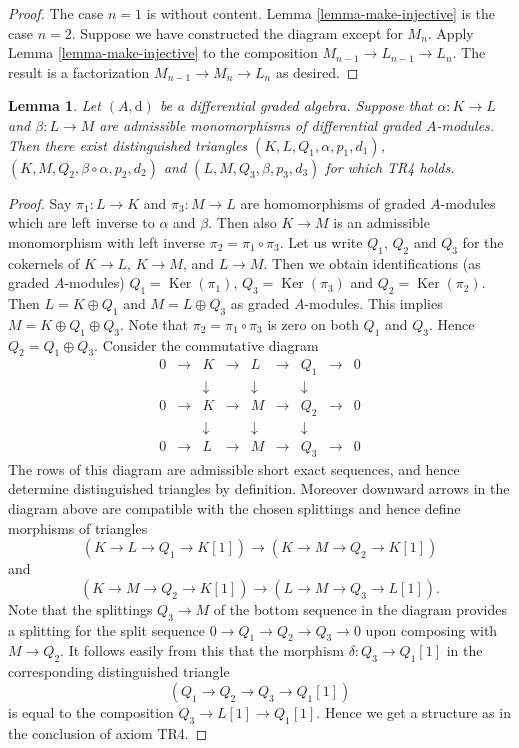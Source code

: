 \documentclass{stacks-project}
\theoremstyle{plain}
\newtheorem{lemma}[subsection]{Lemma}
\theoremstyle{definition}
\theoremstyle{remark}
\numberwithin{equation}{subsection}
\def\Ker{\mathop{\mathrm{Ker}}}
\begin{document}
\begin{proof}
The case $n = 1$ is without content.
Lemma \ref{lemma-make-injective} is the case $n = 2$.
Suppose we have constructed the diagram
except for $M_n$. Apply Lemma \ref{lemma-make-injective} to
the composition $M_{n - 1} \to L_{n - 1} \to L_n$.
The result is a factorization $M_{n - 1} \to M_n \to L_n$
as desired.
\end{proof}

\begin{lemma}
\label{lemma-two-split-injections}
Let $(A, \text{d})$ be a differential graded algebra. Suppose that
$\alpha : K \to L$ and $\beta : L \to M$ are admissible monomorphisms
of differential graded $A$-modules. Then there exist distinguished triangles
$(K, L, Q_1, \alpha, p_1, d_1)$, $(K, M, Q_2, \beta \circ \alpha, p_2, d_2)$
and $(L, M, Q_3, \beta, p_3, d_3)$ for which TR4 holds.
\end{lemma}

\begin{proof}
Say $\pi_1 : L \to K$ and $\pi_3 : M \to L$ are homomorphisms
of graded $A$-modules which are left inverse to $\alpha$ and $\beta$.
Then also $K \to M$ is an admissible monomorphism with left
inverse $\pi_2 = \pi_1 \circ \pi_3$. Let us write $Q_1$, $Q_2$
and $Q_3$ for the cokernels of $K \to L$, $K \to M$, and $L \to M$.
Then we obtain identifications (as graded $A$-modules)
$Q_1 = \Ker(\pi_1)$, $Q_3 = \Ker(\pi_3)$ and
$Q_2 = \Ker(\pi_2)$. Then $L = K \oplus Q_1$ and
$M = L \oplus Q_3$ as graded $A$-modules. This implies
$M = K \oplus Q_1 \oplus Q_3$. Note that $\pi_2 = \pi_1 \circ \pi_3$
is zero on both $Q_1$ and $Q_3$. Hence $Q_2 = Q_1 \oplus Q_3$.
Consider the commutative diagram
$$
\begin{matrix}
0 & \to & K & \to & L & \to & Q_1 & \to & 0 \\
  &     & \downarrow &     & \downarrow &     & \downarrow  & \\
0 & \to & K & \to & M & \to & Q_2 & \to & 0 \\
  &     & \downarrow &     & \downarrow &     & \downarrow  & \\
0 & \to & L & \to & M & \to & Q_3 & \to & 0
\end{matrix}
$$
The rows of this diagram are admissible short exact sequences, and
hence determine distinguished triangles by definition. Moreover
downward arrows in the diagram above are compatible with the chosen
splittings and hence define morphisms of triangles
$$
(K \to L \to Q_1 \to K[1])
\longrightarrow
(K \to M \to Q_2 \to K[1])
$$
and
$$
(K \to M \to Q_2 \to K[1])
\longrightarrow
(L \to M \to Q_3 \to L[1]).
$$
Note that the splittings $Q_3 \to M$ of the bottom sequence in the
diagram provides a splitting for the split sequence
$0 \to Q_1 \to Q_2 \to Q_3 \to 0$ upon composing with $M \to Q_2$.
It follows easily from this that the morphism $\delta : Q_3 \to Q_1[1]$
in the corresponding distinguished triangle
$$
(Q_1 \to Q_2 \to Q_3 \to Q_1[1])
$$
is equal to the composition $Q_3 \to L[1] \to Q_1[1]$.
Hence we get a structure as in the conclusion of axiom TR4.
\end{proof}
\end{document}
